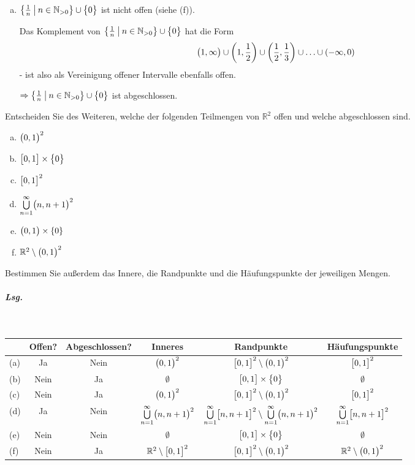 \documentclass{scrreprt}
\begin{document}
\begin{enumerate}[(a)]
\item $\qty{\frac{1}{n} \: \middle | \: n \in \mathbb{N}_{>0}} \cup \qty\big{0}$
  ist nicht offen (siehe (f)).

  Das Komplement von
  $\qty{\frac{1}{n} \: \middle | \: n \in \mathbb{N}_{>0}} \cup \qty\big{0}$
  hat die Form
  \[
    \qty\big(1, \infty) \cup \qty(1, \frac{1}{2}) \cup
    \qty(\frac{1}{2}, \frac{1}{3}) \cup \ldots
    \cup \qty(-\infty, 0)
  \]
  - ist also als Vereinigung offener Intervalle ebenfalls offen.

  $\Rightarrow \qty{\frac{1}{n} \: \middle | \: n \in \mathbb{N}_{>0}}
  \cup \qty\big{0}$ ist abgeschlossen.
\end{enumerate}

Entscheiden Sie des Weiteren, welche der folgenden Teilmengen von $\mathbb{R}^2$
offen und welche abgeschlossen sind.
\begin{multicols}{3}
  \begin{enumerate}[(a)]
  \item $\qty\big(0, 1)^2$
  \item $\qty\big[0, 1] \times \qty\big{0}$
  \item $\qty\big[0, 1]^2$
  \item $\overset{\infty}{\underset{n = 1}\bigcup} \qty\big(n, n + 1)^2$
  \item $\qty\big(0, 1) \times \qty{0}$
  \item $\mathbb{R}^2 \setminus \qty\big(0, 1)^2$
  \end{enumerate}
\end{multicols}
Bestimmen Sie außerdem das Innere, die Randpunkte und die
Häufungspunkte der jeweiligen Mengen.

\subparagraph{Lsg.} \:\\

\begin{tabular}{l|c|c|c|c|c}
  & Offen? & Abgeschlossen? & Inneres & Randpunkte & Häufungspunkte \\
  \hline
  (a) & Ja & Nein & $\qty\big(0, 1)^2$ &
    $\qty\big[0, 1]^2 \setminus \qty\big(0, 1)^2$ & $\qty\big[0, 1]^2$ \\
  (b) & Nein & Ja & $\emptyset$ & $\qty\big[0, 1] \times \qty\big{0}$ &
    $\emptyset$ \\
  (c) & Nein & Ja & $\qty\big(0, 1)^2$ &
    $\qty\big[0, 1]^2 \setminus \qty\big(0, 1)^2$ & $\qty\big[0, 1]^2$ \\
  (d) & Ja & Nein &
    $\overset{\infty}{\underset{n = 1}\bigcup} \qty\big(n, n + 1)^2$ &
    $\overset{\infty}{\underset{n = 1}\bigcup} \qty\big[n, n + 1]^2
      \setminus \overset{\infty}{\underset{n = 1}\bigcup} \qty\big(n, n + 1)^2$ &
    $\overset{\infty}{\underset{n = 1}\bigcup} \qty\big[n, n + 1]^2$\\
  (e) & Nein & Nein & $\emptyset$ &
    $\qty\big[0, 1] \times \qty\big{0}$ & $\emptyset$ \\
  (f) & Nein & Ja & $\mathbb{R}^2 \setminus \qty\big[0, 1]^2$ &
    $\qty\big[0, 1]^2 \setminus \qty\big(0, 1)^2$ &
    $\mathbb{R}^2 \setminus \qty\big(0, 1)^2$
\end{tabular}
\end{document}
